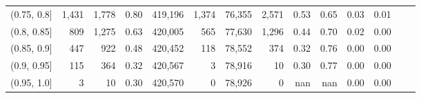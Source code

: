 \begin{tabular}{rrrrrrrrrrrrrr}
(0.75, 0.8]    &   1,431 &  1,778 &   0.80 &  419,196 &    1,374 &  76,355 &   2,571 &  0.53 &  0.65 &  0.03 &      0.01 \\
(0.8, 0.85]    &     809 &  1,275 &   0.63 &  420,005 &      565 &  77,630 &   1,296 &  0.44 &  0.70 &  0.02 &      0.00 \\
(0.85, 0.9]    &     447 &    922 &   0.48 &  420,452 &      118 &  78,552 &     374 &  0.32 &  0.76 &  0.00 &      0.00 \\
(0.9, 0.95]    &     115 &    364 &   0.32 &  420,567 &        3 &  78,916 &      10 &  0.30 &  0.77 &  0.00 &      0.00 \\
(0.95, 1.0]    &       3 &     10 &   0.30 &  420,570 &        0 &  78,926 &       0 &   nan &   nan &  0.00 &      0.00 \\
\bottomrule
\end{tabular}
